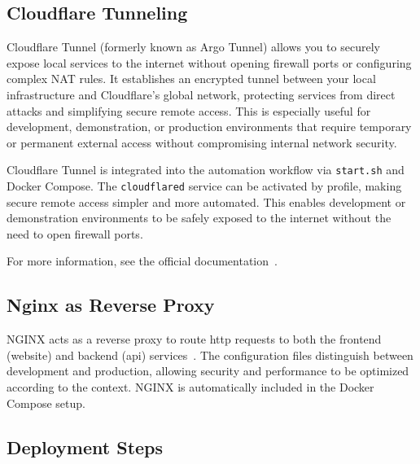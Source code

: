 \subsection{Cloudflare Tunneling} \label{subsec:cloudflare_tunneling}

Cloudflare Tunnel (formerly known as Argo Tunnel) allows you to securely expose local services to the internet without opening firewall ports or configuring complex NAT rules. It establishes an encrypted tunnel between your local infrastructure and Cloudflare's global network, protecting services from direct attacks and simplifying secure remote access. This is especially useful for development, demonstration, or production environments that require temporary or permanent external access without compromising internal network security.

Cloudflare Tunnel is integrated into the automation workflow via \texttt{start.sh} and Docker Compose. The \texttt{cloudflared} service can be activated by profile, making secure remote access simpler and more automated. This enables development or demonstration environments to be safely exposed to the internet without the need to open firewall ports.

For more information, see the official documentation~\cite{cloudflare-tunnel-docs}.

\subsection{Nginx as Reverse Proxy} \label{subsec:nginx_reverse_proxy}

NGINX acts as a reverse proxy to route \ac{http} requests to both the frontend (website) and backend (\ac{api}) services~\cite{nginx-docs}. The configuration files distinguish between development and production, allowing security and performance to be optimized according to the context. NGINX is automatically included in the Docker Compose setup.

\subsection{Deployment Steps} \label{subsec:deployment_steps}

